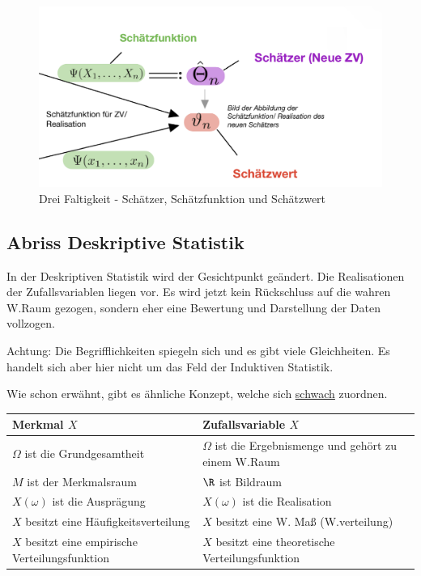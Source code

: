 \begin{figure}[H]
	\centering
	\includegraphics[width=0.7\linewidth]{attachment/chapter_13/Scc073}
	\caption{Drei Faltigkeit - Schätzer, Schätzfunktion und Schätzwert}
\end{figure}

\subsection{Abriss Deskriptive Statistik}

In der Deskriptiven Statistik wird der Gesichtpunkt geändert. Die Realisationen der Zufallsvariablen liegen vor. Es wird jetzt kein Rückschluss auf die wahren \gls{W.}Raum gezogen, sondern eher eine Bewertung und Darstellung der Daten vollzogen. 
\begin{center}
	Achtung: Die Begrifflichkeiten spiegeln sich und es gibt viele Gleichheiten. Es handelt sich aber hier nicht um das Feld der Induktiven Statistik.
\end{center}

Wie schon erwähnt, gibt es ähnliche Konzept, welche sich \underline{schwach} zuordnen.
\begin{table}
	\begin{tabular}{ll}
		Merkmal $X$ & Zufallsvariable $X$ \\ \hline
		$\Omega$ ist die Grundgesamtheit & $\Omega$ ist die Ergebnismenge und gehört zu einem \gls{W.}Raum \\
		$M$ ist der Merkmalsraum & $\R$ ist Bildraum \\
		$X(\omega)$ ist die Ausprägung & $X(\omega)$ ist die Realisation \\
		$X$ besitzt eine Häufigkeitsverteilung & $X$ besitzt eine \gls{W.} Maß (\gls{W.}verteilung) \\
		$X$ besitzt eine empirische Verteilungsfunktion & $X$ besitzt eine theoretische Verteilungsfunktion
	\end{tabular}
\end{table}

